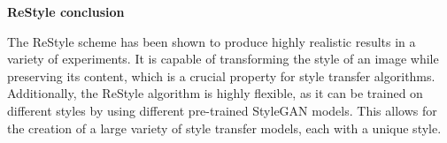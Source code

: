\noindent \textbf{ReStyle conclusion}

\noindent The ReStyle scheme has been shown to produce highly realistic results in a variety of experiments. It is capable of transforming the style of an image while preserving its content, which is a crucial property for style transfer algorithms. Additionally, the ReStyle algorithm is highly flexible, as it can be trained on different styles by using different pre-trained StyleGAN models. This allows for the creation of a large variety of style transfer models, each with a unique style.
